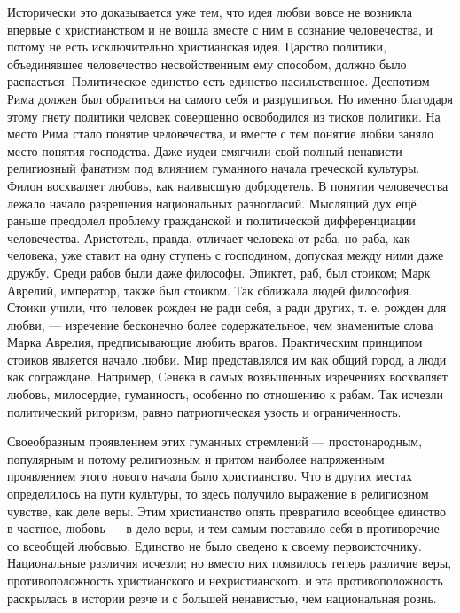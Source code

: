 \documentclass[12pt,oneside]{book}
\begin{document}
Исторически это доказывается уже тем, что идея любви вовсе не возникла впервые с христианством и не вошла вместе с ним в сознание человечества, и потому не есть исключительно христианская идея. Царство политики, объединявшее человечество несвойственным ему способом, должно было распасться. Политическое единство есть единство насильственное. Деспотизм Рима должен был обратиться на самого себя и разрушиться. Но именно благодаря этому гнету политики человек совершенно освободился из тисков политики. На место Рима стало понятие человечества, и вместе с тем понятие любви заняло место понятия господства. Даже иудеи смягчили свой полный ненависти религиозный фанатизм под влиянием гуманного начала греческой культуры. Филон восхваляет любовь, как наивысшую добродетель. В понятии человечества лежало начало разрешения национальных разногласий. Мыслящий дух ещё раньше преодолел проблему гражданской и политической дифференциации человечества. Аристотель, правда, отличает человека от раба, но раба, как человека, уже ставит на одну ступень с господином, допуская между ними даже дружбу. Среди рабов были даже философы. Эпиктет, раб, был стоиком; Марк Аврелий, император, также был стоиком. Так сближала людей философия. Стоики учили, что человек рожден не ради себя, а ради других, т. е. рожден для любви\ddag\let\svthefootnote\thefootnote\let\thefootnote\relax{}\let\thefootnote\svthefootnote, --- изречение бесконечно более содержательное, чем знаменитые слова Марка Аврелия, предписывающие любить врагов. Практическим принципом стоиков является начало любви. Мир представлялся им как общий город, а люди как сограждане. Например, Сенека в самых возвышенных изречениях восхваляет любовь, милосердие, гуманность, особенно по отношению к рабам. Так исчезли политический ригоризм, равно патриотическая узость и ограниченность.



Своеобразным проявлением этих гуманных стремлений --- простонародным, популярным и потому религиозным и притом наиболее напряженным проявлением этого нового начала было христианство. Что в других местах определилось на пути культуры, то здесь получило выражение в религиозном чувстве, как деле веры. Этим христианство опять превратило всеобщее единство в частное, любовь --- в дело веры, и тем самым поставило себя в противоречие со всеобщей любовью. Единство не было сведено к своему первоисточнику. Национальные различия исчезли; но вместо них появилось теперь различие веры, противоположность христианского и нехристианского, и эта противоположность раскрылась в истории резче и с большей ненавистью, чем национальная рознь.
\end{document}
